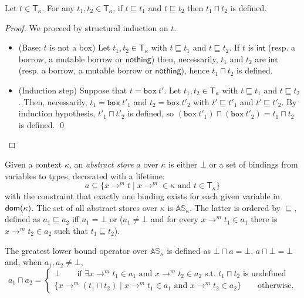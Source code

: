\begin{lemma}\label{lemma:technical-type}
  Let $t\in\mathsf{T}_\kappa$. For any $t_1,t_2\in\mathsf{T}_\kappa$,
  if $t\sqsubseteq t_1$ and $t\sqsubseteq t_2$ then $t_1\sqcap t_2$ is defined.
\end{lemma}
\begin{proof}
  We proceed by structural induction on $t$.
  \begin{itemize}
    \item (Base: $t$ is not a box)
    Let $t_1,t_2\in\mathsf{T}_\kappa$ with $t\sqsubseteq t_1$ and $t\sqsubseteq t_2$.
    If $t$ is $\mathsf{int}$ (resp. a borrow, a mutable borrow or $\mathsf{nothing}$)
    then, necessarily, $t_1$ and $t_2$ are $\mathsf{int}$ (resp. a borrow,
    a mutable borrow or $\mathsf{nothing}$), hence $t_1\sqcap t_2$ is defined.
    \item (Induction step) Suppose that $t = \mathtt{box}\ t'$.
    Let $t_1,t_2\in\mathsf{T}_\kappa$ with $t\sqsubseteq t_1$ and $t\sqsubseteq t_2$.
    Then, necessarily, $t_1 = \mathtt{box}\ t'_1$ and $t_2 = \mathtt{box}\ t'_2$
    with $t'\sqsubseteq t'_1$ and $t'\sqsubseteq t'_2$. By induction
    hypothesis, $t'_1\sqcap t'_2$ is defined, so
    $(\mathtt{box}\ t'_1) \sqcap (\mathtt{box}\ t'_2) = t_1 \sqcap t_2$ is defined.
    \qed
  \end{itemize}
\end{proof}

\begin{definition}
  \label{def:abstract-store}
  Given a context $\kappa$, an \emph{abstract store} $a$ over $\kappa$ is either $\bot$
  or a set of bindings from variables to types, decorated with a lifetime:
  \[
  a\subseteq\{x\to^m t\mid x\to^m\in\kappa\text{ and }t\in\mathsf{T_\kappa}\}
  \]
  with the constraint that exactly one binding exists for each given variable in $\mathsf{dom}(\kappa)$.
  The set of all abstract stores over $\kappa$ is $\mathbb{AS}_\kappa$.
  The latter is ordered by $\sqsubseteq$, defined as $a_1\sqsubseteq a_2$ iff
  $a_1=\bot$ or
  ($a_1\not=\bot$ and for every $x\to^mt_1\in a_1$ there is $x\to^mt_2\in a_2$
  such that $t_1\sqsubseteq t_2$).
\end{definition}

\begin{definition}
  The greatest lower bound operator over $\mathbb{AS}_\kappa$ is defined as
  $\bot\sqcap a=\bot$, $a\sqcap \bot=\bot$ and, when $a_1,a_2\not=\bot$,
  \[
  a_1\sqcap a_2=\begin{cases}
  \bot\qquad\text{if $\exists x\to^m t_1\in a_1$ and $x\to^m t_2\in a_2$ s.t.\ $t_1\sqcap t_2$ is undefined}\\
  \{x\to^m(t_1\sqcap t_2)\mid x\to^m t_1\in a_1\text{ and }x\to^m t_2\in a_2\}\qquad\text{otherwise.}
  \end{cases}
  \]
\end{definition}

